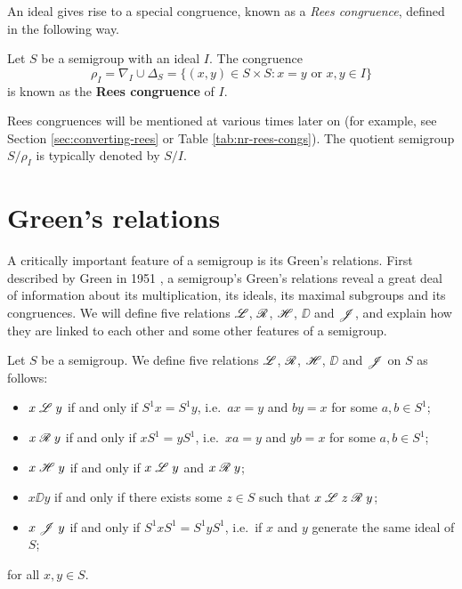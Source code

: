 An ideal gives rise to a special congruence, known as a \textit{Rees
  congruence}, defined in the following way.

\begin{definition}
  \label{def:rees-congruence}
  Let $S$ be a semigroup with an ideal $I$.  The congruence
  $$\rho_I = \nabla_I \cup \Delta_S
  = \{(x,y) \in S \times S : x=y \text{~or~} x,y \in I\}$$
  is known as the \textbf{Rees congruence} of $I$.
\end{definition}

Rees congruences will be mentioned at various times later on (for example, see
Section \ref{sec:converting-rees} or Table \ref{tab:nr-rees-congs}).  The
quotient semigroup $S / \rho_I$ is typically denoted by $S / I$.

\section{Green's relations}
\label{sec:intro-greens}

A critically important feature of a semigroup is its Green's relations.  First
described by Green in 1951 \cite{green}, a semigroup's Green's relations reveal
a great deal of information about its multiplication, its ideals, its maximal
subgroups and its congruences.  We will define five relations $\mathrel{\mathscr{L}}$, $\mathrel{\mathscr{R}}$,
$\mathrel{\mathscr{H}}$, $\DD$ and $\mathrel{\mathscr{J}}$, and explain how they are linked to each other and some
other features of a semigroup.

\begin{definition}
  \label{def:greens-relations}

  Let $S$ be a semigroup.  We define five relations $\mathrel{\mathscr{L}}$, $\mathrel{\mathscr{R}}$, $\mathrel{\mathscr{H}}$, $\DD$
  and $\mathrel{\mathscr{J}}$ on $S$ as follows:
  \begin{itemize}
  \item $x \mathrel{\mathscr{L}} y$ if and only if $S^1x = S^1y$, i.e.~$ax=y$ and $by=x$ for
    some $a,b \in S^1$;
  \item $x \mathrel{\mathscr{R}} y$ if and only if $xS^1 = yS^1$, i.e.~$xa=y$ and $yb=x$ for
    some $a,b \in S^1$;
  \item $x \mathrel{\mathscr{H}} y$ if and only if $x \mathrel{\mathscr{L}} y$ and $x \mathrel{\mathscr{R}} y$;
  \item $x \DD y$ if and only if there exists some $z \in S$ such that
    $x \mathrel{\mathscr{L}} z \mathrel{\mathscr{R}} y$;
  \item $x \mathrel{\mathscr{J}} y$ if and only if $S^1xS^1 = S^1yS^1$, i.e.~if $x$ and $y$
    generate the same ideal of $S$;
  \end{itemize}
  for all $x,y \in S$.
\end{definition}

